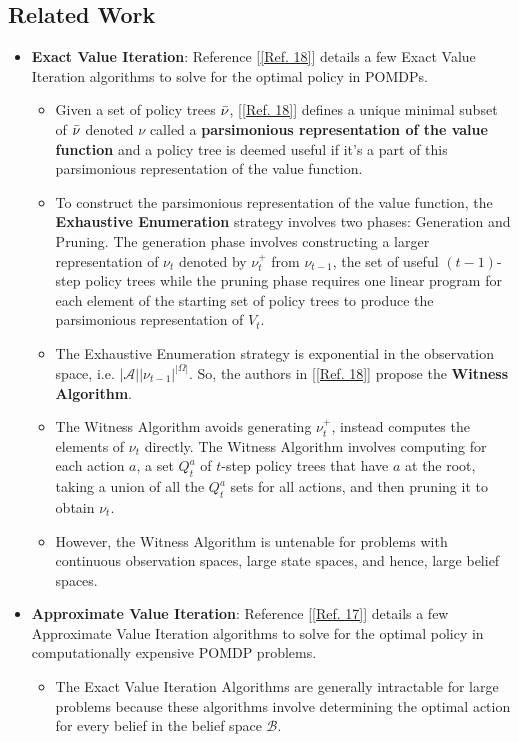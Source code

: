 \documentclass[12pt, draftcls, onecolumn]{IEEEtran}
\begin{document}
\subsection{Related Work}
\begin{itemize}
    \item \textbf{Exact Value Iteration}: Reference [\ref{Ref. 18}] details a few Exact Value Iteration algorithms to solve for the optimal policy in POMDPs.
    \begin{itemize}
        \item Given a set of policy trees $\Bar{\nu}$, [\ref{Ref. 18}] defines a unique minimal subset of $\Bar{\nu}$ denoted $\nu$ called a \textbf{parsimonious representation of the value function} and a policy tree is deemed useful if it's a part of this parsimonious representation of the value function.
        \item To construct the parsimonious representation of the value function, the \textbf{Exhaustive Enumeration} strategy involves two phases: Generation and Pruning. The generation phase involves constructing a larger representation of $\nu_t$ denoted by $\nu_t^+$ from $\nu_{t-1}$, the set of useful $(t-1)$-step policy trees while the pruning phase requires one linear program for each element of the starting set of policy trees to produce the parsimonious representation of $V_t$.
        \item The Exhaustive Enumeration strategy is exponential in the observation space, i.e. $|\mathcal{A}||\nu_{t-1}|^{|\Omega|}$. So, the authors in [\ref{Ref. 18}] propose the \textbf{Witness Algorithm}.
        \item The Witness Algorithm avoids generating $\nu_t^+$, instead computes the elements of $\nu_t$ directly. The Witness Algorithm involves computing for each action $a$, a set $Q_t^a$ of $t$-step policy trees that have $a$ at the root, taking a union of all the $Q_t^a$ sets for all actions, and then pruning it to obtain $\nu_t$.
        \item However, the Witness Algorithm is untenable for problems with continuous observation spaces, large state spaces, and hence, large belief spaces.
    \end{itemize}
    \item \textbf{Approximate Value Iteration}: Reference [\ref{Ref. 17}] details a few Approximate Value Iteration algorithms to solve for the optimal policy in computationally expensive POMDP problems.
    \begin{itemize}
        \item The Exact Value Iteration Algorithms are generally intractable for large problems because these algorithms involve determining the optimal action for every belief in the belief space $\mathcal{B}$.

\end{itemize}
\end{itemize}
\end{document}
